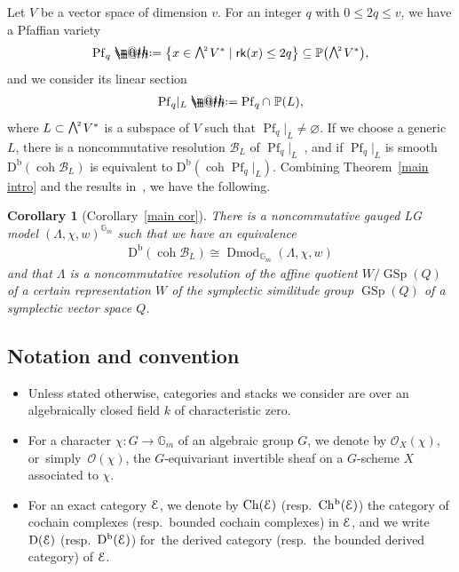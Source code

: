 \documentclass[pdftex]{sigma}%
\makeatletter
\newtheorem{cor}[dfn]{Corollary}
\newcommand*{\defeq}{\mathrel{\rlap{%
 \raisebox{0.3ex}{$\m@th\cdot$}}%
 \raisebox{-0.3ex}{$\m@th\cdot$}}%
 =}
\numberwithin{equation}{section}
\newcommand{\Ch}{\operatorname{Ch}}
\newcommand{\Chb}{\operatorname{Ch^{b}}}
\newcommand{\Dmod}{\operatorname{Dmod}}
\newcommand{\coh}{\operatorname{coh}}
\newcommand{\Db}{\operatorname{D^b}}
\newcommand{\D}{\operatorname{D}}
\newcommand{\Pf}{\operatorname{Pf}}
\newcommand{\GSp}{\operatorname{GSp}}
\newcommand{\rk}{\operatorname{\sf rk}}
\newcommand{\cB}{\mathcal{B}}
\newcommand{\cO}{\mathcal{O}}
\newcommand{\bG}{\mathbb{G}}
\newcommand{\bP}{\mathbb{P}}
\newcommand{\scrE}{\EuScript{E}}
\newcommand{\gwedge}{\raisebox{1pt}[0pt][0pt]{$\textstyle \bigwedge^{\raisebox{-1pt}[0pt][0pt]{\tiny\!$2$\,}}$}}
\newcommand{\rest}{\!|_L}
\makeatother
\begin{document}
Let $V$ be a vector space of dimension $v$. For an integer $q$ with $0\leq 2q\leq v$, we have a Pfaffian variety
\begin{gather*}
\Pf_q\defeq\big\{x\in\gwedge V^* \mid \rk(x)\leq 2q\big\}\subseteq \bP\big(\gwedge V^*\big),
\end{gather*}
and we consider its linear section
\begin{gather*}
\Pf_q\rest\defeq\Pf_q\cap\,\,\bP(L),
\end{gather*}
where $L\subset \gwedge V^*$ is a subspace of $V$ such that $\Pf_q\rest\neq\varnothing$. If we choose a generic $L$, there is a noncommutative resolution $\cB_L$ of $\Pf_q\rest$~\cite{rsv,svdb}, and if $\Pf_q\rest$ is smooth $\Db(\coh\cB_L)$ is equivalent to $\Db(\coh\Pf_q\rest)$. Combining Theorem~\ref{main intro} and the results in~\cite{rs}, we have the following.
\begin{cor}[Corollary~\ref{main cor}]
There is a noncommutative gauged LG model $(\Lambda,\chi,w)^{\bG_m}$ such that we have an equivalence
\begin{gather*}
\Db(\coh \cB_L)\cong \Dmod_{\bG_m}(\Lambda,\chi,w)
\end{gather*}
and that $\Lambda$ is a noncommutative resolution of the affine quotient $W/\GSp(Q)$ of a certain representation $W$ of the symplectic similitude group $\GSp(Q)$ of a symplectic vector space $Q$.
\end{cor}

\subsection{Notation and convention}
\begin{itemize}\itemsep=0pt

\item Unless stated otherwise, categories and stacks we consider are over an algebraically closed field $k$ of characteristic zero.

\item For a character $\chi\colon G\to \bG_m$ of an algebraic group $G$, we denote by $\cO_X(\chi)$, or~sim\-ply~$\cO(\chi)$, the $G$-equivariant invertible sheaf on a $G$-scheme $X$ associated to $\chi$.

\item For an exact category $\scrE$, we denote by $\Ch(\scrE)$ (resp.\ $\Chb(\scrE)$) the category of cochain complexes (resp.\ bounded cochain complexes) in $\scrE$, and we write $\D(\scrE)$ (resp.\ $\Db(\scrE)$) for~the derived category (resp.\ the bounded derived category) of $\scrE$.
\end{itemize}
\end{document}
